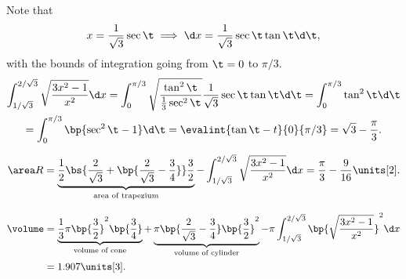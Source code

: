 \begin{solution}
    \begin{ppart}
        Note that \[x = \frac1{\sqrt3} \sec \t \implies \d x = \frac1{\sqrt3} \sec\t\tan\t \d \t,\] with the bounds of integration going from $\t = 0$ to $\pi/3$.
        \begin{gather*}
            \int_{1/\sqrt{3}}^{2/\sqrt3} \sqrt{\frac{3x^2-1}{x^2}} \d x = \int_0^{\pi/3} \sqrt{\frac{\tan^2 \t}{\frac13 \sec^2 \t}} \frac1{\sqrt3} \sec \t \tan \t \d \t = \int_0^{\pi/3} \tan^2 \t \d \t\\
            = \int_0^{\pi/3} \bp{\sec^2 \t - 1} \d \t = \evalint{\tan \t - t}{0}{\pi/3} = \sqrt3 - \frac\pi3.
        \end{gather*}
    \end{ppart}
    \begin{ppart}
        \[\area R = \underbrace{\frac12 \bs{\frac2{\sqrt3} + \bp{\frac2{\sqrt3} - \frac34}}\frac32}_{\text{area of trapezium}} - \int_{1/\sqrt3}^{2/\sqrt3} \sqrt{\frac{3x^2 - 1}{x^2}} \d x = \frac\pi3 - \frac{9}{16} \units[2].\]
    \end{ppart}
    \begin{ppart}
        \begin{align*}
            \volume &= \underbrace{\frac13\pi \bp{\frac32}^2 \bp{\frac34}}_{\text{volume of cone}} + \underbrace{\pi\bp{\frac2{\sqrt3} - \frac34}\bp{\frac32}^2}_{\text{volume of cylinder}} - \pi\int_{1/\sqrt3}^{2/\sqrt3} \bp{\sqrt{\frac{3x^2-1}{x^2}}}^2 \d x\\
            &= 1.907 \units[3].
        \end{align*}
    \end{ppart}
\end{solution}

